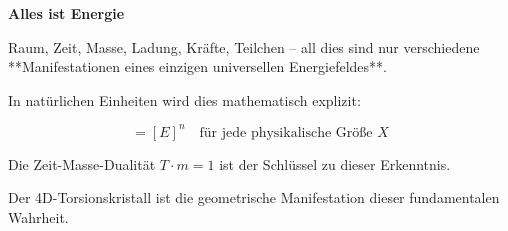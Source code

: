 \begin{revolutionary}

\begin{center}
\textbf{Alles ist Energie}
\end{center}

\normalsize

\vspace{0.3cm}

Raum, Zeit, Masse, Ladung, Kräfte, Teilchen -- all dies sind nur verschiedene **Manifestationen eines einzigen universellen Energiefeldes**.

\vspace{0.3cm}

In natürlichen Einheiten wird dies mathematisch explizit:

\begin{equation}
[X] = [E]^n \quad \text{für jede physikalische Größe } X
\end{equation}

\vspace{0.3cm}

Die Zeit-Masse-Dualität $T \cdot m = 1$ ist der Schlüssel zu dieser Erkenntnis.

\vspace{0.3cm}

Der 4D-Torsionskristall ist die geometrische Manifestation dieser fundamentalen Wahrheit.
\end{revolutionary}
